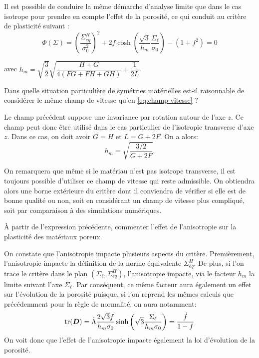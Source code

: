 \documentclass[french,12pt]{exam}
\begin{document}
Il est possible de conduire la même démarche d'analyse limite que dans le cas isotrope pour prendre en compte l'effet de la porosité, ce qui conduit au critère de plasticité suivant \cite{benzerga}:
  \begin{equation}
   \Phi\left( \Sigma     \right)  = \left(  \frac{\Sigma_{eq}^H}{\sigma_0^2} \right)^2 + 2f \cosh{\left(  \frac{\sqrt{3}}{h_m} \frac{\Sigma_\ell}{\sigma_0} \right)} - (1 + f^2) = 0
\label{eq5}
  \end{equation} 

avec $h_m = \sqrt{\dfrac{3}{2}}\sqrt{\dfrac{H+G}{4(FG+FH+GH)} + \dfrac{1}{2L}}$.
\begin{questions}
\question Dans quelle situation particulière de symétries matérielles est-il raisonnable de considérer le même champ de vitesse qu'en \eqref{eq:champ-vitesse} ?
\begin{solution}
Le champ précédent suppose une invariance par rotation autour de l'axe $z$. Ce champ peut donc être utilisé dans le cas particulier de l'isotropie transverse d'axe $z$. Dans ce cas, on doit avoir $G=H$ et $L=G+2F$. On a alors:
$$h_m = \sqrt{\dfrac{3/2}{G+2F}}.$$

On remarquera que même si le matériau n'est pas isotrope transverse, il est toujours possible d'utiliser ce champ de vitesse qui reste admissible. On obtiendra alors une borne extérieure du critère dont il conviendra de vérifier si elle est de bonne qualité ou non, soit en considérant un champ de vitesse plus compliqué, soit par comparaison à des simulations numériques.
\end{solution}
    \question \`A partir de l'expression précédente, commenter l'effet de l'anisotropie sur la plasticité des matériaux poreux.
\begin{solution}
On constate que l'anisotropie impacte plusieurs aspects du critère. Premièrement, l'anisotropie impacte la définition de la norme équivalente $\Sigma_{eq}^H$. De plus, si l'on trace le critère dans le plan $(\Sigma_\ell,\Sigma_{eq}^H)$, l'anisotropie impacte, via le facteur $h_m$ la limite suivant l'axe $\Sigma_\ell$. Par conséquent, ce même facteur aura également un effet sur l'évolution de la porosité puisque, si l'on reprend les mêmes calculs que précédemment pour la règle de normalité, on aura notamment:
$$\mathrm{tr}(\boldsymbol{D}) = \dot{\Lambda}\dfrac{2\sqrt{3}f}{h_m\sigma_0} \sinh{\left(  \sqrt{3} \frac{\Sigma_\ell}{h_m\sigma_0} \right)} = \dfrac{\dot{f}}{1-f}$$
On voit donc que l'effet de l'anisotropie impacte également la loi d'évolution de la porosité.
\end{solution}
\end{questions}
\end{document}
